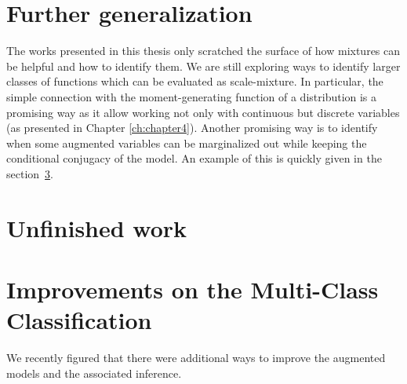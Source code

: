 

\graphicspath{{8/figures/}}


\section{Further generalization}
The works presented in this thesis only scratched the surface of how mixtures can be helpful and how to identify them.
We are still exploring ways to identify larger classes of functions which can be evaluated as scale-mixture.
In particular, the simple connection with the moment-generating function of a distribution is a promising way as it allow working not only with continuous but discrete variables (as presented in Chapter \ref{ch:chapter4}).
Another promising way is to identify when some augmented variables can be marginalized out while keeping the conditional conjugacy of the model.
An example of this is quickly given in the section~\ref{sec:improve}.

\section{Unfinished work}

\section{Improvements on the Multi-Class Classification}
\label{sec:improve}
We recently figured that there were additional ways to improve the augmented models and the associated inference.



